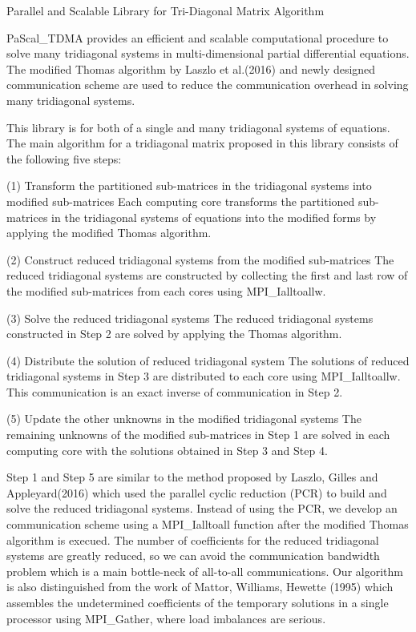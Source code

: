 Parallel and Scalable Library for Tri-\/\+Diagonal Matrix Algorithm

Pa\+Scal\+\_\+\+T\+D\+MA provides an efficient and scalable computational procedure to solve many tridiagonal systems in multi-\/dimensional partial differential equations. The modified Thomas algorithm by Laszlo et al.(2016) and newly designed communication scheme are used to reduce the communication overhead in solving many tridiagonal systems.

This library is for both of a single and many tridiagonal systems of equations. The main algorithm for a tridiagonal matrix proposed in this library consists of the following five steps\+:


\begin{DoxyItemize}
\item (1) Transform the partitioned sub-\/matrices in the tridiagonal systems into modified sub-\/matrices Each computing core transforms the partitioned sub-\/matrices in the tridiagonal systems of equations into the modified forms by applying the modified Thomas algorithm.
\item (2) Construct reduced tridiagonal systems from the modified sub-\/matrices The reduced tridiagonal systems are constructed by collecting the first and last row of the modified sub-\/matrices from each cores using M\+P\+I\+\_\+\+Ialltoallw.
\item (3) Solve the reduced tridiagonal systems The reduced tridiagonal systems constructed in Step 2 are solved by applying the Thomas algorithm.
\item (4) Distribute the solution of reduced tridiagonal system The solutions of reduced tridiagonal systems in Step 3 are distributed to each core using M\+P\+I\+\_\+\+Ialltoallw. This communication is an exact inverse of communication in Step 2.
\item (5) Update the other unknowns in the modified tridiagonal systems The remaining unknowns of the modified sub-\/matrices in Step 1 are solved in each computing core with the solutions obtained in Step 3 and Step 4.
\end{DoxyItemize}

Step 1 and Step 5 are similar to the method proposed by Laszlo, Gilles and Appleyard(2016) which used the parallel cyclic reduction (P\+CR) to build and solve the reduced tridiagonal systems. Instead of using the P\+CR, we develop an communication scheme using a M\+P\+I\+\_\+\+Ialltoall function after the modified Thomas algorithm is execued. The number of coefficients for the reduced tridiagonal systems are greatly reduced, so we can avoid the communication bandwidth problem which is a main bottle-\/neck of all-\/to-\/all communications. Our algorithm is also distinguished from the work of Mattor, Williams, Hewette (1995) which assembles the undetermined coefficients of the temporary solutions in a single processor using M\+P\+I\+\_\+\+Gather, where load imbalances are serious.


